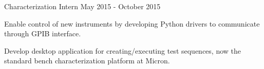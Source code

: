 \begin{cventries}
  \cventry
    {Characterization Intern} %
    {} %
    {} %
    {May 2015 - October 2015} %
    {
      \begin{cvitems} %
        \item {Enable control of new instruments by developing Python drivers to communicate through GPIB interface.}
        \item {Develop desktop application for creating/executing test sequences, now the standard bench characterization platform at Micron.}
      \end{cvitems}
    }
\end{cventries}
